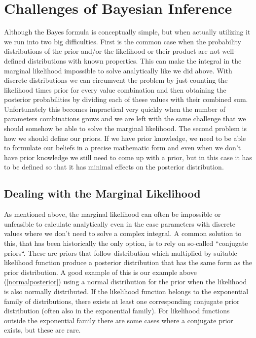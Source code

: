\documentclass[12pt,a4paper,leqno]{report}
\theoremstyle{plain}
\theoremstyle{definition}
\theoremstyle{remark}
\begin{document}
\section{Challenges of Bayesian Inference}\label{bayesinferencechallenges}

Although the Bayes formula is conceptually simple, but when actually utilizing
it we run into two big difficulties. First is the common case when the
probability distributions of the prior and/or the likelihood or their product
are not well-defined distributions with known properties. This can make the
integral in the marginal likelihood impossible to solve analytically like we did
above. With discrete distributions we can circumvent the problem by just counting the
likelihood times prior for every value combination and then obtaining the posterior
probabilities by dividing each of these values with their combined sum. Unfortunately
this becomes impractical very quickly when the number of parameters combinations grows
and we are left with the same challenge that we should somehow be able to solve the
marginal likelihood. The second problem is how we should define our priors.
If we have prior knowledge, we need to be able to
formulate our beliefs in a precise mathematic form and even when we don't have prior knowledge we still
need to come up with a prior, but in this case it has to be defined so that it has
minimal effects on the posterior distribution.

\subsection{Dealing with the Marginal Likelihood}\label{marginallikehoodproblems}

As mentioned above, the marginal likelihood can often be impossible or
unfeasible to calculate analytically even in the case parameters with discrete
values where we don't need to solve a complex integral. A common solution to this,
that has been historically the only option, is to rely on so-called ``conjugate
priors``. These are priors that follow distribution which multiplied by
suitable likelihood function produce a posterior distribution that has the same
form as the prior distribution. A good example of this is our example above (\ref{normalposterior}) using a normal
distribution for the prior when the likelihood is also normally distributed. If
the likelihood function belongs to the exponential family of distributions, there
exists at least one corresponding conjugate prior distribution (often also in
the exponential family). For likelihood functions outside the exponential family
there are some cases where a conjugate prior exists, but these are rare.
\end{document}
